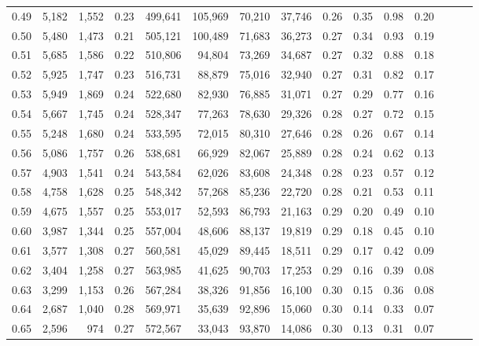 \begin{tabular}{rrrrrrrrrrrrrrr}
0.49 &   5,182 &  1,552 &  0.23 &  499,641 &  105,969 &   70,210 &   37,746 &  0.26 &  0.35 &  0.98 &      0.20 \\
0.50 &   5,480 &  1,473 &  0.21 &  505,121 &  100,489 &   71,683 &   36,273 &  0.27 &  0.34 &  0.93 &      0.19 \\
0.51 &   5,685 &  1,586 &  0.22 &  510,806 &   94,804 &   73,269 &   34,687 &  0.27 &  0.32 &  0.88 &      0.18 \\
0.52 &   5,925 &  1,747 &  0.23 &  516,731 &   88,879 &   75,016 &   32,940 &  0.27 &  0.31 &  0.82 &      0.17 \\
0.53 &   5,949 &  1,869 &  0.24 &  522,680 &   82,930 &   76,885 &   31,071 &  0.27 &  0.29 &  0.77 &      0.16 \\
0.54 &   5,667 &  1,745 &  0.24 &  528,347 &   77,263 &   78,630 &   29,326 &  0.28 &  0.27 &  0.72 &      0.15 \\
0.55 &   5,248 &  1,680 &  0.24 &  533,595 &   72,015 &   80,310 &   27,646 &  0.28 &  0.26 &  0.67 &      0.14 \\
0.56 &   5,086 &  1,757 &  0.26 &  538,681 &   66,929 &   82,067 &   25,889 &  0.28 &  0.24 &  0.62 &      0.13 \\
0.57 &   4,903 &  1,541 &  0.24 &  543,584 &   62,026 &   83,608 &   24,348 &  0.28 &  0.23 &  0.57 &      0.12 \\
0.58 &   4,758 &  1,628 &  0.25 &  548,342 &   57,268 &   85,236 &   22,720 &  0.28 &  0.21 &  0.53 &      0.11 \\
0.59 &   4,675 &  1,557 &  0.25 &  553,017 &   52,593 &   86,793 &   21,163 &  0.29 &  0.20 &  0.49 &      0.10 \\
0.60 &   3,987 &  1,344 &  0.25 &  557,004 &   48,606 &   88,137 &   19,819 &  0.29 &  0.18 &  0.45 &      0.10 \\
0.61 &   3,577 &  1,308 &  0.27 &  560,581 &   45,029 &   89,445 &   18,511 &  0.29 &  0.17 &  0.42 &      0.09 \\
0.62 &   3,404 &  1,258 &  0.27 &  563,985 &   41,625 &   90,703 &   17,253 &  0.29 &  0.16 &  0.39 &      0.08 \\
0.63 &   3,299 &  1,153 &  0.26 &  567,284 &   38,326 &   91,856 &   16,100 &  0.30 &  0.15 &  0.36 &      0.08 \\
0.64 &   2,687 &  1,040 &  0.28 &  569,971 &   35,639 &   92,896 &   15,060 &  0.30 &  0.14 &  0.33 &      0.07 \\
0.65 &   2,596 &    974 &  0.27 &  572,567 &   33,043 &   93,870 &   14,086 &  0.30 &  0.13 &  0.31 &      0.07 \\

\end{tabular}
